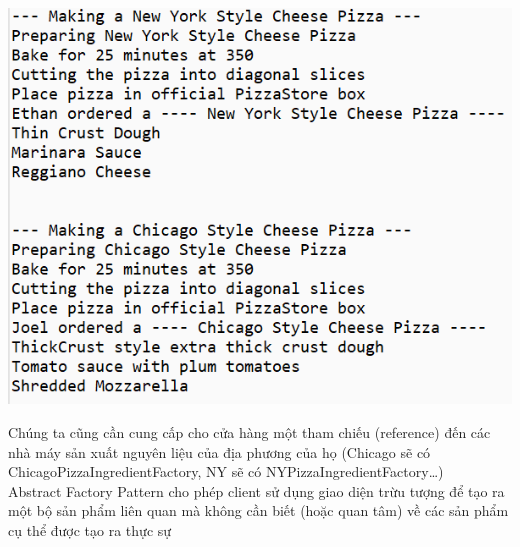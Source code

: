 \begin{center}
	\includegraphics{GALLEYS/images/chapter5/images17}
\end{center}
Chúng ta cũng cần cung cấp cho cửa hàng một tham chiếu (reference) đến các nhà máy sản xuất nguyên liệu của địa phương của họ (Chicago sẽ có ChicagoPizzaIngredientFactory, NY sẽ có NYPizzaIngredientFactory…)\\
Abstract Factory Pattern cho phép client sử dụng giao diện trừu tượng để tạo ra một bộ sản phẩm liên quan mà không cần biết (hoặc quan tâm) về các sản phẩm cụ thể được tạo ra thực sự\\
